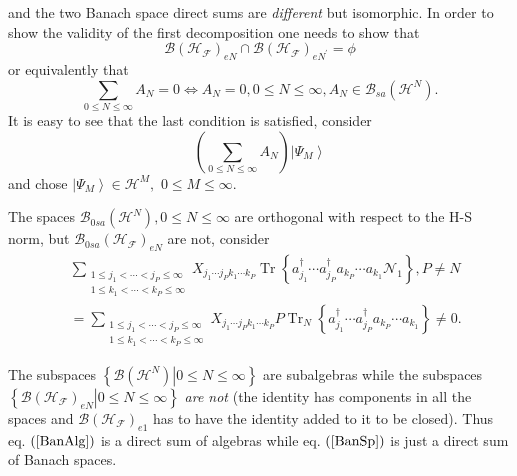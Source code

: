 \documentclass[aps,preprint]{revtex4}%
\begin{document}
and the two Banach space direct sums are \emph{different} but isomorphic. In
order to show the validity of the first decomposition one needs to show that
\begin{equation}
\mathcal{B}\left(  \mathcal{H}_{\mathcal{F}}\right)  _{eN}\cap\mathcal{B}%
\left(  \mathcal{H}_{\mathcal{F}}\right)  _{eN^{\prime}}=\phi
\end{equation}
or equivalently that
\begin{equation}
\sum_{0\leq N\leq\infty}A_{N}=0\Leftrightarrow A_{N}=0,0\leq N\leq\infty
,A_{N}\in\mathcal{B}_{sa}\left(  \mathcal{H}^{N}\right)  .
\end{equation}
It is easy to see that the last condition is satisfied, consider
\begin{equation}
\left(  \sum_{0\leq N\leq\infty}A_{N}\right)  \left\vert \Psi_{M}%
\right\rangle
\end{equation}
and chose $\left\vert \Psi_{M}\right\rangle \in\mathcal{H}^{M},$ $0\leq
M\leq\infty.$

The spaces $\mathcal{B}_{0sa}\left(  \mathcal{H}^{N}\right)  ,0\leq
N\leq\infty$ are orthogonal with respect to the H-S norm, but $\mathcal{B}%
_{0sa}\left(  \mathcal{H}_{\mathcal{F}}\right)  _{eN}$ are not, consider%
\begin{align}
&  \sum_{\substack{1\leq j_{1}<\cdots<j_{P}\leq\infty\\1\leq k_{1}%
<\cdots<k_{P}\leq\infty}}X_{j_{1}\cdots j_{P}k_{1}\cdots k_{P}}%
\operatorname*{Tr}\left\{  a_{j_{1}}^{\dagger}\cdots a_{j_{P}}^{\dagger
}a_{k_{P}}\cdots a_{k_{1}}\mathcal{N}_{1}\right\}  ,P\neq N\nonumber\\
&  =\sum_{\substack{1\leq j_{1}<\cdots<j_{P}\leq\infty\\1\leq k_{1}%
<\cdots<k_{P}\leq\infty}}X_{j_{1}\cdots j_{P}k_{1}\cdots k_{P}}%
P\operatorname*{Tr}\nolimits_{N}\left\{  a_{j_{1}}^{\dagger}\cdots a_{j_{P}%
}^{\dagger}a_{k_{P}}\cdots a_{k_{1}}\right\}  \neq0.
\end{align}


The subspaces $\left\{  \left.  \mathcal{B}\left(  \mathcal{H}^{N}\right)
\right\vert 0\leq N\leq\infty\right\}  $ are subalgebras while the subspaces
$\left\{  \left.  \mathcal{B}\left(  \mathcal{H}_{\mathcal{F}}\right)
_{eN}\right\vert 0\leq N\leq\infty\right\}  $ \emph{are not }(the identity has
components in all the spaces and $\mathcal{B}\left(  \mathcal{H}_{\mathcal{F}%
}\right)  _{e1}$ has to have the identity added to it to be closed). Thus eq.
$\left(  \ref{BanAlg}\right)  $ is a direct sum of algebras while eq. $\left(
\ref{BanSp}\right)  $ is just a direct sum of Banach spaces.
\end{document}
